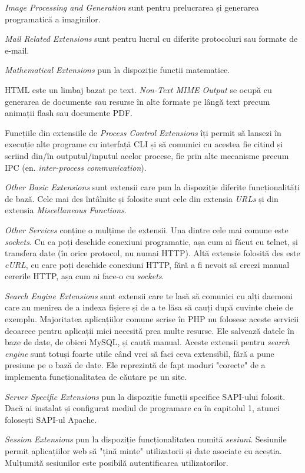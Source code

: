 \textit{Image Processing and Generation} sunt pentru
prelucrarea și generarea programatică a imaginilor.

\textit{Mail Related Extensions} sunt pentru
lucrul cu diferite protocoluri sau formate de e-mail.

\textit{Mathematical Extensions} pun la dispoziție
funcții matematice.

HTML este un limbaj bazat pe text.
\textit{Non-Text MIME Output} se ocupă cu
generarea de documente sau resurse în alte formate pe
lângă text precum animații flash sau documente PDF.

Funcțiile din extensiile de \textit{Process Control Extensions}
îți permit să lansezi în execuție alte programe cu interfață
CLI și să
comunici cu acestea fie citind și scriind din/în outputul/inputul
acelor procese, fie prin alte mecanisme precum IPC
(en. \textsl{inter-process communication}).

\textit{Other Basic Extensions} sunt extensii care pun
la dispoziție diferite funcționalități de bază.
Cele mai des întâlnite și folosite sunt cele din
extensia \textit{URLs} și din extensia \textit{Miscellaneous Functions}.

\textit{Other Services} conține o mulțime de extensii. Una dintre
cele mai comune este \textit{sockets}. Cu ea poți deschide
conexiuni programatic, așa cum ai făcut cu telnet, și transfera
date (în orice protocol, nu numai HTTP). Altă extensie folosită des
este \textit{cURL}, cu care poți deschide conexiuni HTTP, fără
a fi nevoit să creezi manual cererile HTTP, așa cum ai face-o cu
\textit{sockets}.

\textit{Search Engine Extensions} sunt extensii care te lasă
să comunici cu alți daemoni care au menirea de a indexa
fișiere și de a te lăsa să cauți după cuvinte cheie de
exemplu. Majoritatea aplicațiilor comune scrise în PHP
nu folosesc aceste servicii deoarece pentru aplicații mici
necesită prea multe resurse. Ele salvează datele în baze de
date, de obicei MySQL, și caută manual. Aceste extensii
pentru \textit{search engine} sunt totuși foarte
utile când vrei să faci ceva extensibil, fără a pune
presiune pe o bază de date. Ele reprezintă de fapt moduri "corecte"
de a implementa funcționalitatea de căutare pe un site.

\textit{Server Specific Extensions} pun la dispoziție
funcții specifice SAPI-ului folosit. Dacă ai instalat
și configurat mediul de programare ca în capitolul 1,
atunci folosești SAPI-ul Apache.

\textit{Session Extensions} pun la dispoziție funcționalitatea
numită \textsl{sesiuni}. Sesiunile permit aplicațiilor web
să "țină minte" utilizatorii și date asociate cu aceștia.
Mulțumită sesiunilor este posibilă autentificarea utilizatorilor.

